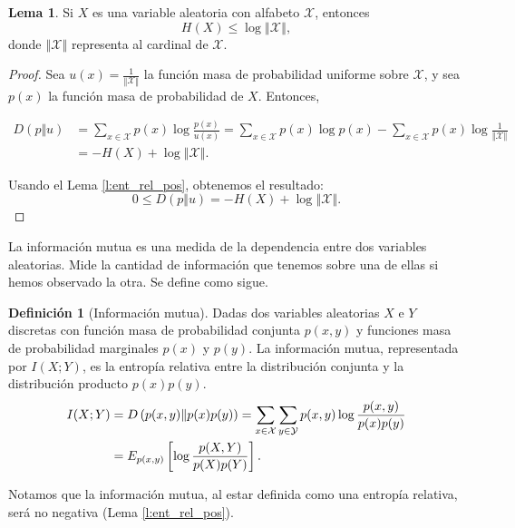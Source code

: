 \documentclass[12pt,a4paper]{report} %
\theoremstyle{definition}
\newtheorem{definition}{Definición}[section]
\newtheorem{lemma}[theorem]{Lema}
\begin{document}
\begin{lemma}
  Si $X$ es una variable aleatoria con alfabeto $\mathcal{X}$, entonces \[
  H(X) \leq \log{\left\Vert\mathcal{X}\right\Vert}, 
  \]
donde $\left\Vert\mathcal{X}\right\Vert$ representa al cardinal de $\mathcal{X}$.
\end{lemma}
\begin{proof}
  Sea $u(x) = \frac{1}{\left\Vert\mathcal{X}\right\Vert}$ la función masa de probabilidad uniforme sobre $\mathcal{X}$, y sea $p(x)$ la función masa de probabilidad de $X$. Entonces,
  
 \begin{align*}
   D \left ( p \Vert u \right ) &= \sum_{x \in \mathcal{X}}
   p(x) \log \frac{p(x)}{u(x)} = \sum_{x \in \mathcal{X}} p(x) \log p(x) - \sum_{x \in \mathcal{X}} p(x) \log \frac{1}{\left\Vert\mathcal{X}\right\Vert}\\
  &= -H(X) + \log \left\Vert\mathcal{X}\right\Vert.
 \end{align*}
 
    Usando el Lema \ref{l:ent_rel_pos}, obtenemos el resultado: \[
0 \leq D\left ( p \Vert u \right ) = -H(X) + \log \left\Vert\mathcal{X}\right\Vert.
    \]
\end{proof}

La información mutua es una medida de la dependencia entre dos variables aleatorias. Mide la cantidad de información que tenemos sobre una de ellas si hemos observado la otra. Se define como sigue.

\begin{definition}[Información mutua]\label{def:im_disc}
  Dadas dos variables aleatorias $X$ e $Y$ discretas con función masa de probabilidad conjunta $p(x,y)$ y funciones masa de probabilidad marginales $p(x)$ y $p(y)$. La información mutua, representada por $I(X;Y)$, es la entropía relativa entre la distribución conjunta y la distribución producto $p(x)p(y)$.
  \begin{align*}
  I(X;Y) &= D \left ( p(x,y) \Vert p(x)p(y) \right ) = \sum_{x \in \mathcal{X}}\sum_{y \in \mathcal{Y}} p(x,y) \log \frac{p(x,y)}{p(x)p(y)}\\ &= \relax{E}_{p(x,y)} \left [ \log \frac{p(X,Y)}{p(X)p(Y)}\right].\\
  \end{align*}
\end{definition}

Notamos que la información mutua, al estar definida como una entropía relativa, será no negativa (Lema \ref{l:ent_rel_pos}).\\
\end{document}
